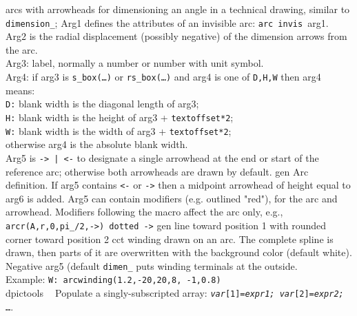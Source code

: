   {arcs with arrowheads for dimensioning an angle in a technical drawing,
    similar to {\tt dimension\_};
      Arg1 defines the attributes of an invisible arc: {\tt arc invis }arg1.\\
      Arg2 is the radial displacement (possibly negative) of the
      dimension arrows from the arc.\\
      Arg3: label, normally a number or number with unit symbol.\\
      Arg4: if arg3 is {\tt s\_box(\ldots)} or {\tt rs\_box(\ldots)} and
      arg4 is one of {\tt D,H,W} then arg4 means:\\
      {\tt D:} blank width is the diagonal length of arg3;\\
      {\tt H:} blank width is the height of arg3 + {\tt textoffset*2};\\
      {\tt W:} blank width is the width of arg3 + {\tt textoffset*2};\\
      otherwise arg4 is the absolute blank width.\\
      Arg5 is {\tt -> | <-} to designate a single arrowhead
      at the end or start of the reference arc; otherwise both arrowheads
      are drawn by default.}%
%
  {gen}%
  {Arc definition. If arg5 contains {\tt <-} or {\tt ->} then a midpoint
    arrowhead of height equal to arg6 is added. Arg5 can contain modifiers
    (e.g. outlined "red"), for the arc and arrowhead.  Modifiers following
    the macro affect the arc only,
    e.g., {\tt arcr(A,r,0,pi\_/2,->) dotted ->}%
   }%
%
  {gen}%
  {line toward position 1 with rounded corner toward position 2}%
%
  {cct}%
  {winding drawn on an arc. The complete spline is drawn, then parts of it
   are overwritten with the background color (default white).  Negative
   arg5 (default {\tt dimen\_} puts winding terminals at the outside.\\
   Example: {\tt W: arcwinding(1.2,-20,20,8, -1,0.8)}\\
   }%
%
  {dpictools}%
  {$\;\;$  Populate a singly-subscripted array:
    {\tt {\sl var}[1]={\sl expr1;} {\sl var}[2]={\sl expr2;} \ldots}.}%
%
